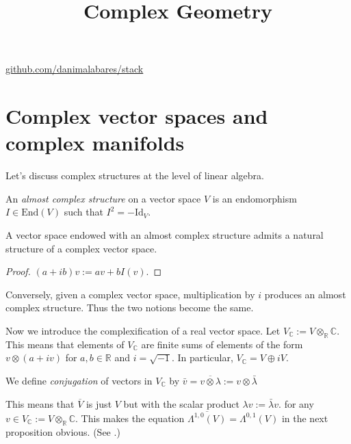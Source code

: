 



\title{Complex Geometry}
\maketitle

\label{section-phantom}
\hfill
\href{http://github.com/danimalabares/stack}{github.com/danimalabares/stack}

\tableofcontents

\section{Complex vector spaces and complex manifolds}
\label{section-complex-structure}


\noindent
Let's discuss complex structures at the level of linear algebra.

\begin{definition}
\label{definition-complex-structure-vector-space}
An {\it almost complex structure} on a vector space $V$
is an endomorphism $I \in \text{End}(V)$ such that $I^2 = -\text{Id}_V$.
\end{definition}

\begin{lemma}
\label{lemma-almost-complex-structure-then-complex-module}
A vector space endowed with an almost complex structure
admits a natural structure of a complex vector space.
\end{lemma}

\begin{proof}
$(a+ib)v:=av + b I(v)$.
\end{proof}

\noindent
Conversely, given a complex vector space, 
multiplication by $i$ produces an almost complex structure.
Thus the two notions become the same.

\medskip\noindent
Now we introduce the complexification of a real vector space.
Let $V_{\mathbb{C}}:=V \otimes_{\mathbb{R}}\mathbb{C}$.
This means that elements of $V_{\mathbb{C}}$
are finite sums of elements of the form $v \otimes (a+iv)$
for $a,b \in \mathbb{R}$ and $i = \sqrt{-1}$.
In particular, $V_\mathbb{C}=V \oplus i V$.

We define {\it conjugation} of vectors in $V_{\mathbb{C}}$ by
$\bar{v}=\overline{v \otimes \lambda} := v \otimes \bar{\lambda}$


This means that $\overline{V}$ is just $V$ but 
with the scalar product $\lambda v:=\bar{\lambda}v$.
for any $v \in V_{\mathbb{C}}:=V \otimes_{\mathbb{R}}\mathbb{C}$.
This makes the equation
$\overline{\Lambda^{1,0}(V)}=\Lambda^{0,1}(V)$ 
in the next proposition obvious.
(See \cite[p. 25]{huc}.)

